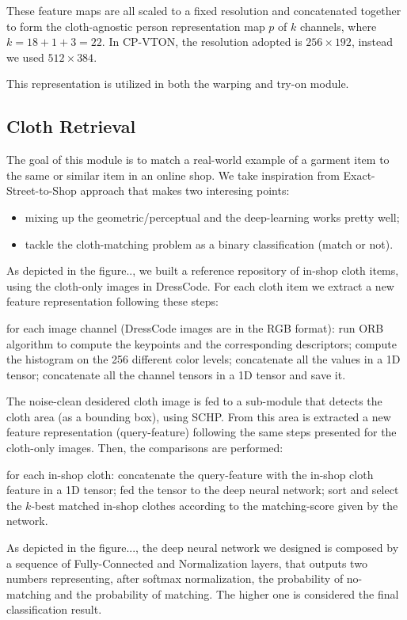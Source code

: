 These feature maps are all scaled to a fixed resolution and concatenated together to form the cloth-agnostic person representation map $p$ of $k$ channels, where $k = 18 + 1 + 3 = 22$.
In CP-VTON, the resolution adopted is $256 \times 192$, instead we used $512 \times 384$.

This representation is utilized in both the warping and try-on module.


\subsection{Cloth Retrieval}

The goal of this module is to match a real-world example of a garment item to the same or similar item in an online shop. We take inspiration from Exact-Street-to-Shop approach that makes two interesing points:
\begin{itemize}
	\item mixing up the geometric/perceptual and the deep-learning works pretty well;
	\item tackle the cloth-matching problem as a binary classification (match or not).
\end{itemize}

As depicted in the figure.., we built a reference repository of in-shop cloth items, using the cloth-only images in DressCode. For each cloth item we extract a new feature representation following these steps:
\begin{outline}
 \1 for each image channel (DressCode images are in the RGB format):
   \2 run ORB algorithm to compute the keypoints and the corresponding descriptors;
   \2 compute the histogram on the 256 different color levels;
   \2 concatenate all the values in a 1D tensor;
 \1 concatenate all the channel tensors in a 1D tensor and save it.
\end{outline}

The noise-clean desidered cloth image is fed to a sub-module that detects the cloth area (as a bounding box), using SCHP. From this area is extracted a new feature representation (query-feature) following the same steps presented for the cloth-only images. Then, the comparisons are performed:
\begin{outline}
\1 for each in-shop cloth:
	\2 concatenate the query-feature with the in-shop cloth feature in a 1D tensor;
	\2 fed the tensor to the deep neural network;
\1 sort and select the $k$-best matched in-shop clothes according to the matching-score given by the network. 
\end{outline}
As depicted in the figure..., the deep neural network we designed is composed by a sequence of Fully-Connected and Normalization layers, that outputs two numbers representing, after softmax normalization, the probability of no-matching and the probability of matching. The higher one is considered the final classification result.

